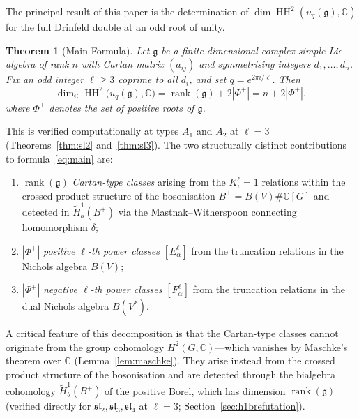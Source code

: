 \documentclass[11pt,letterpaper]{amsart}
\theoremstyle{plain}
\newtheorem{theorem}{Theorem}[section]
\theoremstyle{definition}
\theoremstyle{remark}
\newcommand{\HH}{\operatorname{HH}}
\newcommand{\CC}{\mathbb{C}}
\newcommand{\bplus}{B^{+}}
\begin{document}
The principal result of this paper is the determination of $\dim \HH^2(u_q(\mathfrak{g}), \CC)$ for the full Drinfeld double at an odd root of unity.

\begin{theorem}[Main Formula]
\label{thm:main}
Let $\mathfrak{g}$ be a finite-dimensional complex simple Lie algebra of rank $n$ with Cartan matrix $(a_{ij})$ and symmetrising integers $d_1, \ldots, d_n$. Fix an odd integer $\ell \geq 3$ coprime to all $d_i$, and set $q = e^{2\pi i/\ell}$. Then
\begin{equation}
\label{eq:main}
\dim_\CC \HH^2\bigl(u_q(\mathfrak{g}), \CC\bigr) = \operatorname{rank}(\mathfrak{g}) + 2|\Phi^+| = n + 2|\Phi^+|,
\end{equation}
where $\Phi^+$ denotes the set of positive roots of $\mathfrak{g}$.
\end{theorem}

\noindent
This is verified computationally at types $A_1$ and $A_2$ at $\ell = 3$ (Theorems~\ref{thm:sl2} and~\ref{thm:sl3}). The two structurally distinct contributions to formula~\eqref{eq:main} are:
\begin{enumerate}[label=(\roman*)]
\item $\operatorname{rank}(\mathfrak{g})$ \emph{Cartan-type classes} arising from the $K_i^\ell = 1$ relations within the crossed product structure of the bosonisation $\bplus = B(V) \# \CC[G]$ and detected in $\tilde{H}^1_b(B^+)$ via the Mastnak--Witherspoon connecting homomorphism $\delta$;
\item $|\Phi^+|$ \emph{positive $\ell$-th power classes} $[E_\alpha^\ell]$ from the truncation relations in the Nichols algebra $B(V)$;
\item $|\Phi^+|$ \emph{negative $\ell$-th power classes} $[F_\alpha^\ell]$ from the truncation relations in the dual Nichols algebra $B(V^*)$.
\end{enumerate}
A critical feature of this decomposition is that the Cartan-type classes cannot originate from the group cohomology $H^2(G, \CC)$---which vanishes by Maschke's theorem over $\CC$ (Lemma~\ref{lem:maschke}). They arise instead from the crossed product structure of the bosonisation and are detected through the bialgebra cohomology $\tilde{H}^1_b(B^+)$ of the positive Borel, which has dimension $\operatorname{rank}(\mathfrak{g})$ (verified directly for $\mathfrak{sl}_2, \mathfrak{sl}_3, \mathfrak{sl}_4$ at $\ell = 3$; Section~\ref{sec:h1brefutation}).
\end{document}
